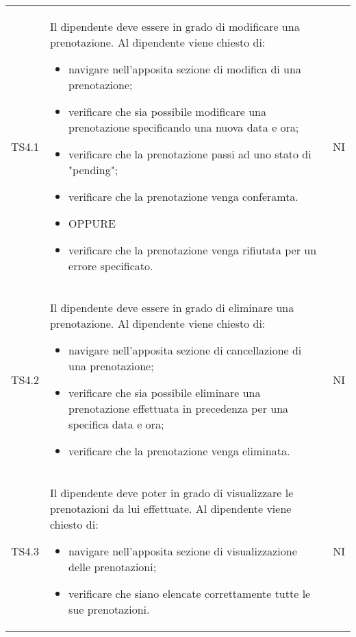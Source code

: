 {\begin{longtable}{ c C{11cm} c }
        TS4.1&
        \begin{flushleft}
            Il dipendente deve essere in grado di modificare una prenotazione.
            Al dipendente viene chiesto di:
        \end{flushleft}
        \begin{itemize}
            \item navigare nell'apposita sezione di modifica di una prenotazione;
            \item verificare che sia possibile modificare una prenotazione specificando una nuova data e ora;
            \item verificare che la prenotazione passi ad uno stato di "pending";
            \item verificare che la prenotazione venga conferamta.
            \item [] OPPURE
            \item verificare che la prenotazione venga rifiutata per un errore specificato.
        \end{itemize}&
        NI\\

        TS4.2&
        \begin{flushleft}
            Il dipendente deve essere in grado di eliminare una prenotazione.
            Al dipendente viene chiesto di:
        \end{flushleft}
        \begin{itemize}
            \item navigare nell'apposita sezione di cancellazione di una prenotazione;
            \item verificare che sia possibile eliminare una prenotazione effettuata in precedenza per una specifica data e ora;
            \item verificare che la prenotazione venga eliminata.
        \end{itemize}&
        NI\\

        TS4.3&
        \begin{flushleft}
            Il dipendente deve poter in grado di visualizzare le prenotazioni da lui effettuate.
            Al dipendente viene chiesto di:
        \end{flushleft}
        \begin{itemize}
            \item navigare nell'apposita sezione di visualizzazione delle prenotazioni;
            \item verificare che siano elencate correttamente tutte le sue prenotazioni.
        \end{itemize}&
        NI\\


\end{longtable}}
